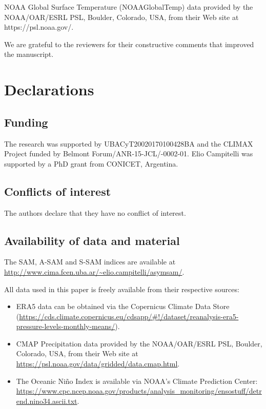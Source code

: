 \documentclass[smallextended]{svjour3}       %
\begin{document}
\begin{acknowledgements}
NOAA Global Surface Temperature (NOAAGlobalTemp) data provided by the NOAA/OAR/ESRL PSL, Boulder, Colorado, USA, from their Web site at https://psl.noaa.gov/.

We are grateful to the reviewers for their constructive comments that improved the manuscript.
\end{acknowledgements}

\hypertarget{declarations}{%
\section*{Declarations}\label{declarations}}

\hypertarget{funding}{%
\subsection*{Funding}\label{funding}}

The research was supported by UBACyT20020170100428BA and the CLIMAX Project funded by Belmont Forum/ANR-15-JCL/-0002-01.
Elio Campitelli was supported by a PhD grant from CONICET, Argentina.

\hypertarget{conflicts-of-interest}{%
\subsection*{Conflicts of interest}\label{conflicts-of-interest}}

The authors declare that they have no conflict of interest.

\hypertarget{availability-of-data-and-material}{%
\subsection*{Availability of data and material}\label{availability-of-data-and-material}}

The SAM, A\nobreakdash-SAM and S\nobreakdash-SAM indices are available at \url{http://www.cima.fcen.uba.ar/~elio.campitelli/asymsam/}.

All data used in this paper is freely available from their respective sources:

\begin{itemize}
\item
  ERA5 data can be obtained via the Copernicus Climate Data Store (\url{https://cds.climate.copernicus.eu/cdsapp/\#!/dataset/reanalysis-era5-pressure-levels-monthly-means/}).
\item
  CMAP Precipitation data provided by the NOAA/OAR/ESRL PSL, Boulder, Colorado, USA, from their Web site at \url{https://psl.noaa.gov/data/gridded/data.cmap.html}.
\item
  The Oceanic Niño Index is available via NOAA's Climate Prediction Center: \url{https://www.cpc.ncep.noaa.gov/products/analysis_monitoring/ensostuff/detrend.nino34.ascii.txt}.
\end{itemize}
\end{document}
